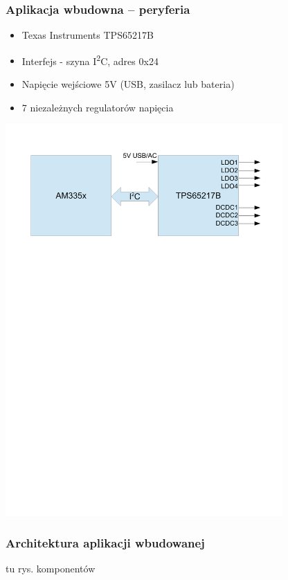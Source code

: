\documentclass[dvipsnames,table]{beamer}
\begin{document}
\begin{frame}
\frametitle{Aplikacja wbudowna -- peryferia}
\begin{itemize}
	\item Texas Instruments TPS65217B
	\item Interfejs - szyna I\textsuperscript{2}C, adres 0x24
	\item Napięcie wejściowe 5V (USB, zasilacz lub bateria)
	\item 7 niezależnych regulatorów napięcia
\end{itemize}
\includegraphics[width=300pt]{img_am335x-tps65217.pdf}
\end{frame}


\begin{frame}
\frametitle{Architektura aplikacji wbudowanej}
tu rys. komponentów
\end{frame}
\end{document}
